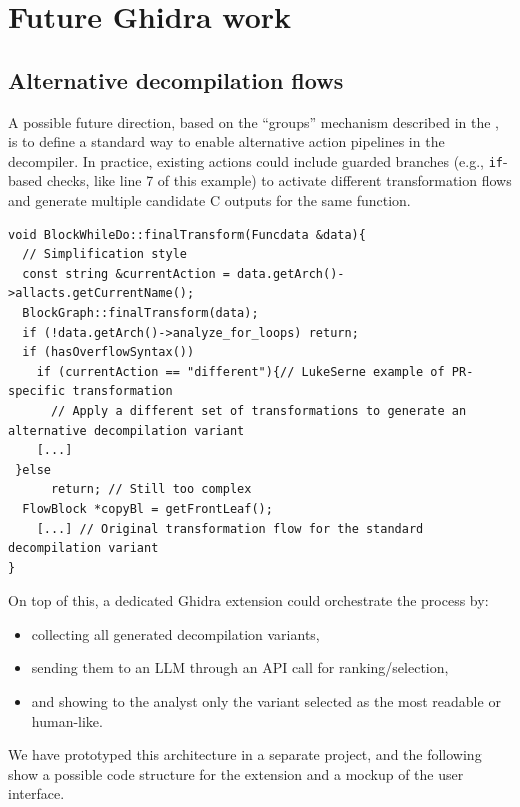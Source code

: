 \chapter{Future Ghidra work}\label{app:future-ghidra-work}

\section{Alternative decompilation flows}

A possible future direction, based on the ``groups'' mechanism described in the , is to define a standard way to enable alternative action pipelines in the decompiler.
In practice, existing actions could include guarded branches (e.g., \texttt{if}-based checks, like line 7 of this example) to activate different transformation flows and generate multiple candidate C outputs for the same function.

\begin{lstlisting}[style=Cstyle, caption={Example of different branch of code if a specific group is set}]
void BlockWhileDo::finalTransform(Funcdata &data){
  // Simplification style
  const string &currentAction = data.getArch()->allacts.getCurrentName();
  BlockGraph::finalTransform(data);
  if (!data.getArch()->analyze_for_loops) return;
  if (hasOverflowSyntax()) 
    if (currentAction == "different"){// LukeSerne example of PR-specific transformation
      // Apply a different set of transformations to generate an alternative decompilation variant
    [...]
 }else
      return; // Still too complex
  FlowBlock *copyBl = getFrontLeaf();
    [...] // Original transformation flow for the standard decompilation variant
}
\end{lstlisting}


On top of this, a dedicated Ghidra extension could orchestrate the process by:
\begin{itemize}
    \item collecting all generated decompilation variants,
    \item sending them to an LLM through an API call for ranking/selection,
    \item and showing to the analyst only the variant selected as the most readable or human-like.
\end{itemize}

We have prototyped this architecture in a separate project, and the following  show a possible code structure for the extension and a mockup of the user interface.

